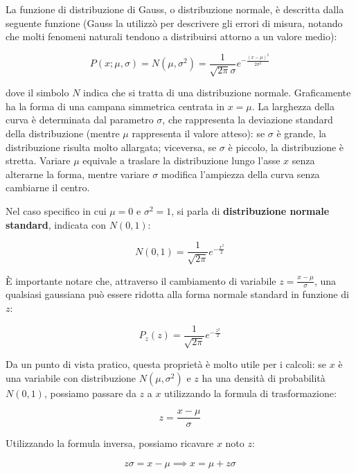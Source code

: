 \documentclass{article}
\theoremstyle{remark}
\begin{document}
La funzione di distribuzione di Gauss, o distribuzione normale, è descritta dalla seguente funzione (Gauss la utilizzò per descrivere gli errori di misura, notando che molti fenomeni naturali tendono a distribuirsi attorno a un valore medio):

\begin{equation}
P(x; \mu , \sigma ) = N(\mu,\sigma^2) = \frac{1}{\sqrt{2\pi}\sigma}e^{-\frac{(x-\mu)^2}{2\sigma^2}}
\end{equation}

dove il simbolo $N$ indica che si tratta di una distribuzione normale.
Graficamente ha la forma di una campana simmetrica centrata in $x = \mu$. La larghezza della curva è determinata dal parametro $\sigma$, che rappresenta la deviazione standard della distribuzione (mentre $\mu$ rappresenta il valore atteso): se $\sigma$ è grande, la distribuzione risulta molto allargata; viceversa, se $\sigma$ è piccolo, la distribuzione è stretta.
Variare $\mu$ equivale a traslare la distribuzione lungo l'asse $x$ senza alterarne la forma, mentre variare $\sigma$ modifica l'ampiezza della curva senza cambiarne il centro.

Nel caso specifico in cui $\mu = 0$ e $\sigma^2 = 1$, si parla di \textbf{distribuzione normale standard}, indicata con $N(0,1)$:

\begin{equation}
N(0,1) = \frac{1}{\sqrt{2 \pi}} e^{-\frac{x^2}{2}}
\end{equation}

È importante notare che, attraverso il cambiamento di variabile $z = \frac{x-\mu}{\sigma}$, una qualsiasi gaussiana può essere ridotta alla forma normale standard in funzione di $z$:

\begin{equation}
P_z(z) = \frac{1}{\sqrt{2 \pi}} e^{-\frac{z^2}{2}}
\end{equation}

Da un punto di vista pratico, questa proprietà è molto utile per i calcoli: se $x$ è una variabile con distribuzione $N(\mu, \sigma^2)$ e $z$ ha una densità di probabilità $N(0,1)$, possiamo passare da $z$ a $x$ utilizzando la formula di trasformazione:

\begin{equation}
z = \frac{x-\mu}{\sigma}
\end{equation}

Utilizzando la formula inversa, possiamo ricavare $x$ noto $z$:

\begin{equation}
z\sigma = x - \mu \implies x = \mu + z\sigma
\end{equation}
\end{document}
